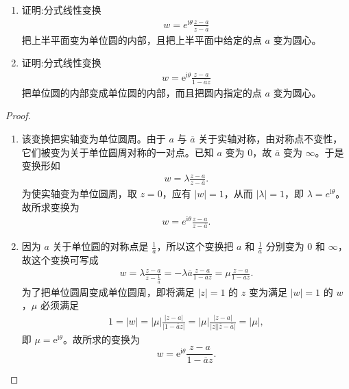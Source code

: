 \documentclass[../../main.tex]{subfiles}%
\begin{document}
\begin{proposition}\label{proposition:例2.5.16}
\begin{enumerate}[(1)]
\item 证明:分式线性变换
\begin{align*}
w = e^{\mathrm{i}\theta} \frac{z-a}{z-\overline{a}}
\end{align*}
把上半平面变为单位圆的内部，且把上半平面中给定的点 $a$ 变为圆心。

\item 证明:分式线性变换
\begin{align*}
w = \mathrm{e}^{\mathrm{i}\theta} \frac{z - a}{1 - \overline{a} z}
\end{align*}
把单位圆的内部变成单位圆的内部，而且把圆内指定的点 \( a \) 变为圆心。
\end{enumerate}
\end{proposition}
\begin{proof}
\begin{enumerate}[(1)]
\item 该变换把实轴变为单位圆周。由于 $a$ 与 $\overline{a}$ 关于实轴对称，由对称点不变性，它们被变为关于单位圆周对称的一对点。已知 $a$ 变为 $0$，故 $\overline{a}$ 变为 $\infty$。于是变换形如
\begin{align*}
w = \lambda \frac{z-a}{z-\overline{a}}.
\end{align*}
为使实轴变为单位圆周，取 $z=0$，应有 $|w|=1$，从而 $|\lambda|=1$，即 $\lambda=e^{\mathrm{i}\theta }$。故所求变换为
\begin{align*}
w = e^{\mathrm{i}\theta} \frac{z-a}{z-\overline{a}}.
\end{align*}

\item 因为 \( a \) 关于单位圆的对称点是 \( \frac{1}{\overline{a}} \)，所以这个变换把 \( a \) 和 \( \frac{1}{\overline{a}} \) 分别变为 \( 0 \) 和 \( \infty \)，故这个变换可写成
\[
\begin{aligned}
w = \lambda \frac{z - a}{z - \frac{1}{\overline{a}}} = -\lambda \overline{a} \frac{z - a}{1 - \overline{a} z} = \mu \frac{z - a}{1 - \overline{a} z}.
\end{aligned}
\]
为了把单位圆周变成单位圆周，即将满足 \( |z| = 1 \) 的 \( z \) 变为满足 \( |w| = 1 \) 的 \( w \)，\( \mu \) 必须满足
\[
\begin{aligned}
1 = |w| = |\mu| \frac{|z - a|}{|1 - \overline{a} z|} = |\mu| \frac{|z - a|}{|z| |\overline{z} - \overline{a}|} = |\mu|,
\end{aligned}
\]
即 \( \mu = \mathrm{e}^{\mathrm{i}\theta} \)。故所求的变换为
\[
w = \mathrm{e}^{\mathrm{i}\theta} \frac{z - a}{1 - \overline{a} z}.
\] 
\end{enumerate}
\end{proof}
\end{document}

